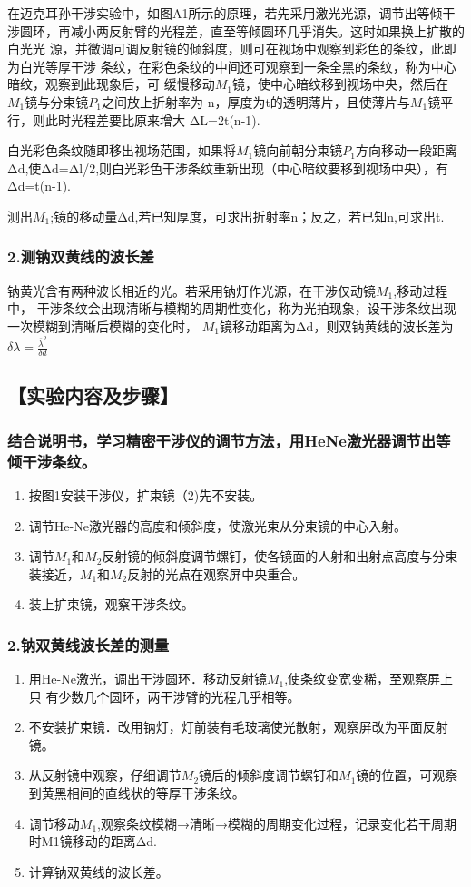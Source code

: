 \documentclass[12pt,a4paper,UTF8]{ctexart}
\begin{document}
在迈克耳孙干涉实验中，如图A1所示的原理，若先采用激光光源，调节出等倾干
涉圆环，再减小两反射臂的光程差，直至等倾圆环几乎消失。这时如果换上扩散的白光光
源，并微调可调反射镜的倾斜度，则可在视场中观察到彩色的条纹，此即为白光等厚干涉
条纹，在彩色条纹的中间还可观察到一条全黑的条纹，称为中心暗纹，观察到此现象后，可
缓慢移动$M_1$镜，使中心暗纹移到视场中央，然后在$M_1$镜与分束镜$P_1$之间放上折射率为
n，厚度为t的透明薄片，且使薄片与$M_1$镜平行，则此时光程差要比原来增大
ΔL=2t(n-1).

白光彩色条纹随即移出视场范围，如果将$M_1$镜向前朝分束镜$P_1$方向移动一段距离
Δd,使Δd=Δl/2,则白光彩色干涉条纹重新出现（中心暗纹要移到视场中央），有
Δd=t(n-1).

测出$M_1$;镜的移动量Δd,若已知厚度，可求出折射率n；反之，若已知n,可求出t.

\subsubsection*{2.测钠双黄线的波长差}
钠黄光含有两种波长相近的光。若采用钠灯作光源，在干涉仅动镜$M_1$,移动过程中，
干涉条纹会出现清晰与模糊的周期性变化，称为光拍现象，设干涉条纹出现一次模糊到清晰后模糊的变化时，
$M_1$镜移动距离为Δd，则双钠黄线的波长差为$\delta\lambda =\frac {\overline{\lambda} ^{2}}{\delta d}$

\subsection*{【实验内容及步骤】}
\subsubsection*{结合说明书，学习精密干涉仪的调节方法，用HeNe激光器调节出等倾干涉条纹。}
    \begin{enumerate}
		\item 按图1安装干涉仪，扩束镜（2)先不安装。
		\item 调节He-Ne激光器的高度和倾斜度，使激光束从分束镜的中心入射。
		\item 调节$M_1$和$M_2$反射镜的倾斜度调节螺钉，使各镜面的人射和出射点高度与分束
		装接近，$M_1$和$M_2$反射的光点在观察屏中央重合。
		\item 装上扩束镜，观察干涉条纹。 
	\end{enumerate}

\subsubsection*{2.钠双黄线波长差的测量}
    \begin{enumerate}
		\item 用He-Ne激光，调出干涉圆环．移动反射镜$M_1$,使条纹变宽变稀，至观察屏上只
		有少数几个圆环，两干涉臂的光程几乎相等。
		\item 不安装扩束镜．改用钠灯，灯前装有毛玻璃使光散射，观察屏改为平面反射镜。
		\item 从反射镜中观察，仔细调节$M_2$镜后的倾斜度调节螺钉和$M_1$镜的位置，可观察
		到黄黑相间的直线状的等厚干涉条纹。
		\item 调节移动$M_1$,观察条纹模糊→清晰→模糊的周期变化过程，记录变化若干周期
		时M1镜移动的距离Δd.
		\item 计算钠双黄线的波长差。
	\end{enumerate}
\end{document}
